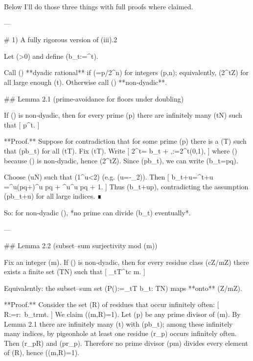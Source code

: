 Below I’ll do those three things with full proofs where claimed.

---

# 1) A fully rigorous version of (iii).2

Let (\beta>0) and define (b_t:=^t\beta\rfloor).

Call (\beta) **dyadic rational** if (\beta=p/2^n) for integers (p,n); equivalently, (2^t\beta\in\mathbb Z) for all large enough (t). Otherwise call (\beta) **non‑dyadic**.

## Lemma 2.1 (prime-avoidance for floors under doubling)

If (\beta) is non‑dyadic, then for every prime (p) there are infinitely many (t\in\mathbb N) such that
[
p\nmid {}^t\beta\rfloor.
]

**Proof.** Suppose for contradiction that for some prime (p) there is a (T) such that (p\mid b_t) for all (t\ge T). Fix (t\ge T). Write
[
2^t\beta = b_t + \varepsilon,\qquad \varepsilon:={2^t\beta}\in(0,1),
]
where (\varepsilon{}) because (\beta) is non‑dyadic, hence (2^t\beta\notin\mathbb Z). Since (p\mid b_t), we can write (b_t=pq).

Choose (u\in\mathbb N) such that (1^u\varepsilon<2) (e.g. (u=\lceil -\log_2\varepsilon\rceil)). Then
[
b_{t+u}=^{t+u}\beta\rfloor
=^u(pq+\varepsilon)^u pq + ^u\varepsilon{}^u pq + 1.
]
Thus (b_{t+u}\pmod p), contradicting the assumption (p\mid b_{t+u}) for all large indices. ∎

So: for non‑dyadic (\beta), *no prime can divide (b_t) eventually*.

---

## Lemma 2.2 (subset–sum surjectivity mod (m))

Fix an integer (m). If (\beta) is non‑dyadic, then for every residue class (c\in\mathbb Z/m\mathbb Z) there exists a finite set (T\subset\mathbb N) such that
[
\sum_{t\in T}^t\beta\rfloor \equiv c \pmod m.
]

Equivalently: the subset–sum set (P(\beta):={\sum_{t\in T} b_t: T\subset\mathbb N}) maps **onto** (\mathbb Z/m\mathbb Z).

**Proof.** Consider the set (R) of residues that occur infinitely often:
[
R:={r:\ b_t\equiv r\pmod mt}.
]
We claim (\gcd(m,R)=1). Let (p) be any prime divisor of (m). By Lemma 2.1 there are infinitely many (t) with (p\nmid b_t); among these infinitely many indices, by pigeonhole at least one residue (r_p) occurs infinitely often. Then (r_p\in R) and (p\nmid r_p). Therefore no prime divisor (p\mid m) divides every element of (R), hence (\gcd(m,R)=1).

